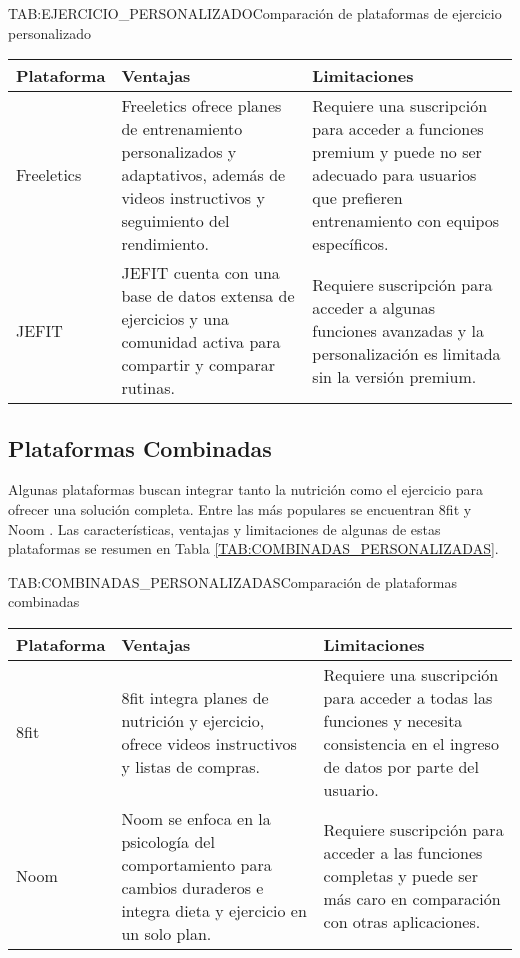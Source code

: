 \begin{table}[Plataformas de Ejercicio Personalizado]{TAB:EJERCICIO_PERSONALIZADO}{Comparación de plataformas de ejercicio personalizado}
  \begin{tabular}{|p{3cm}|p{5cm}|p{5cm}|}
    \hline
    \textbf{Plataforma} & \textbf{Ventajas} & \textbf{Limitaciones} \\
    \hline
    Freeletics & Freeletics ofrece planes de entrenamiento personalizados y adaptativos, además de videos instructivos y seguimiento del rendimiento. & Requiere una suscripción para acceder a funciones premium y puede no ser adecuado para usuarios que prefieren entrenamiento con equipos específicos. \\
    \hline
    JEFIT & JEFIT cuenta con una base de datos extensa de ejercicios y una comunidad activa para compartir y comparar rutinas. & Requiere suscripción para acceder a algunas funciones avanzadas y la personalización es limitada sin la versión premium. \\
    \hline
  \end{tabular}
\end{table}

\subsection{Plataformas Combinadas}

Algunas plataformas buscan integrar tanto la nutrición como el ejercicio para ofrecer una solución completa. Entre las más populares se encuentran 8fit \cite{8fit} y Noom \cite{Noom}. Las características, ventajas y limitaciones de algunas de estas plataformas se resumen en Tabla \ref{TAB:COMBINADAS_PERSONALIZADAS}.

\begin{table}[Plataformas Combinadas]{TAB:COMBINADAS_PERSONALIZADAS}{Comparación de plataformas combinadas}
  \begin{tabular}{|p{3cm}|p{5cm}|p{5cm}|}
    \hline
    \textbf{Plataforma} & \textbf{Ventajas} & \textbf{Limitaciones} \\
    \hline
    8fit & 8fit integra planes de nutrición y ejercicio, ofrece videos instructivos y listas de compras. & Requiere una suscripción para acceder a todas las funciones y necesita consistencia en el ingreso de datos por parte del usuario. \\
    \hline
    Noom & Noom se enfoca en la psicología del comportamiento para cambios duraderos e integra dieta y ejercicio en un solo plan. & Requiere suscripción para acceder a las funciones completas y puede ser más caro en comparación con otras aplicaciones. \\
    \hline
  \end{tabular}
\end{table}

